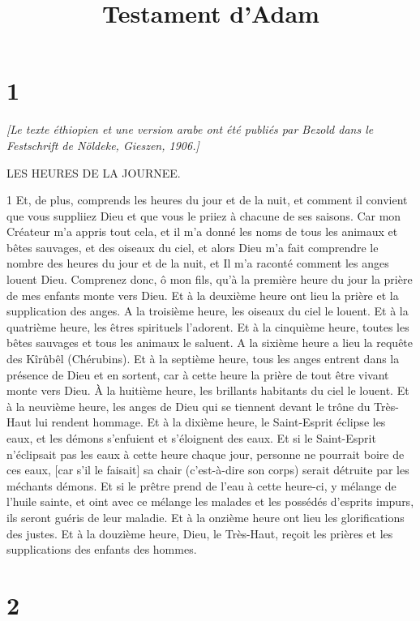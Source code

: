 

\title{Testament d'Adam}

\chapter{1}

\par \textit{[Le texte éthiopien et une version arabe ont été publiés par Bezold dans le Festschrift de Nöldeke, Gieszen, 1906.]}

\par LES HEURES DE LA JOURNEE.

\par 1 Et, de plus, comprends les heures du jour et de la nuit, et comment il convient que vous suppliiez Dieu et que vous le priiez à chacune de ses saisons. Car mon Créateur m'a appris tout cela, et il m'a donné les noms de tous les animaux et bêtes sauvages, et des oiseaux du ciel, et alors Dieu m'a fait comprendre le nombre des heures du jour et de la nuit, et Il m'a raconté comment les anges louent Dieu. Comprenez donc, ô mon fils, qu'à la première heure du jour la prière de mes enfants monte vers Dieu. Et à la deuxième heure ont lieu la prière et la supplication des anges. A la troisième heure, les oiseaux du ciel le louent. Et à la quatrième heure, les êtres spirituels l'adorent. Et à la cinquième heure, toutes les bêtes sauvages et tous les animaux le saluent. A la sixième heure a lieu la requête des Kîrûbêl (Chérubins). Et à la septième heure, tous les anges entrent dans la présence de Dieu et en sortent, car à cette heure la prière de tout être vivant monte vers Dieu. À la huitième heure, les brillants habitants du ciel le louent. Et à la neuvième heure, les anges de Dieu qui se tiennent devant le trône du Très-Haut lui rendent hommage. Et à la dixième heure, le Saint-Esprit éclipse les eaux, et les démons s'enfuient et s'éloignent des eaux. Et si le Saint-Esprit n'éclipsait pas les eaux à cette heure chaque jour, personne ne pourrait boire de ces eaux, [car s'il le faisait] sa chair (c'est-à-dire son corps) serait détruite par les méchants démons. Et si le prêtre prend de l'eau à cette heure-ci, y mélange de l'huile sainte, et oint avec ce mélange les malades et les possédés d'esprits impurs, ils seront guéris de leur maladie. Et à la onzième heure ont lieu les glorifications des justes. Et à la douzième heure, Dieu, le Très-Haut, reçoit les prières et les supplications des enfants des hommes.

\chapter{2}

